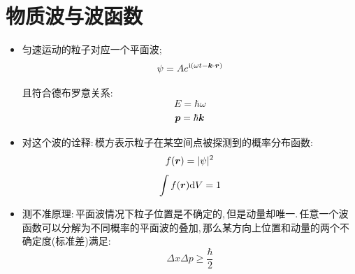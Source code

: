 
\section{物质波与波函数}

\begin{itemize}
\item 匀速运动的粒子对应一个平面波;
\[\psi=Ae^{{\rm i}(\omega t-\boldsymbol{k}\cdot \boldsymbol{r})}\]

且符合德布罗意关系:
\[E=\hbar\omega\]
\[\boldsymbol{p}=\hbar\boldsymbol{k}\]

\item 对这个波的诠释:\,模方表示粒子在某空间点被探测到的概率分布函数:
\[f(\boldsymbol{r})=|\psi|^2\]
\[\int f(\boldsymbol{r})\textrm{d} V=1\]

\item 测不准原理:\,平面波情况下粒子位置是不确定的,\,但是动量却唯一.\,任意一个波函数可以分解为不同概率的平面波的叠加,\,那么某方向上位置和动量的两个不确定度(标准差)满足:
\[\Delta x\Delta p\geq \frac{\hbar}{2}\]

\end{itemize}
